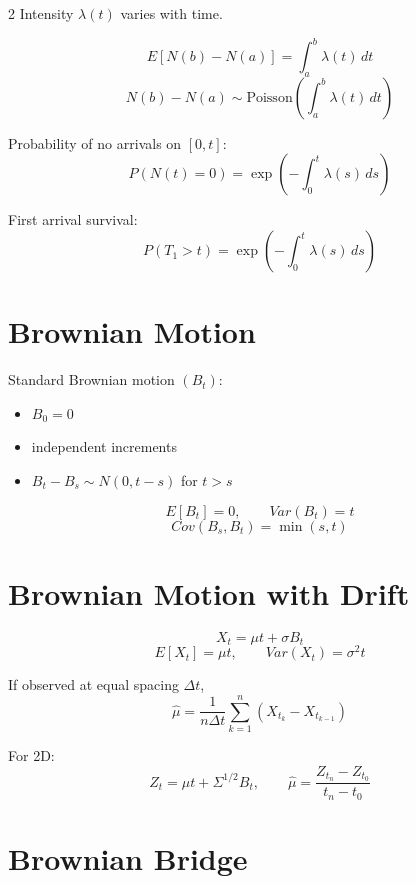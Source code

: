 \documentclass[10pt]{article}
\begin{document}
\begin{multicols}{2}
Intensity \(\lambda(t)\) varies with time.

\begin{formulabox}
\[
E[N(b)-N(a)]=\int_a^b \lambda(t)\,dt
\]
\[
N(b)-N(a)\sim \text{Poisson}\!\left(\int_a^b \lambda(t)\,dt\right)
\]
\end{formulabox}

Probability of no arrivals on \([0,t]\):
\[
P(N(t)=0)=\exp\left(-\int_0^t \lambda(s)\,ds\right)
\]

First arrival survival:
\[
P(T_1>t)=\exp\left(-\int_0^t \lambda(s)\,ds\right)
\]

\section{Brownian Motion}

\begin{definitionbox}
Standard Brownian motion \((B_t)\):
\begin{itemize}[leftmargin=12pt,itemsep=1pt]
\item \(B_0=0\)
\item independent increments
\item \(B_t-B_s\sim N(0,t-s)\) for \(t>s\)
\end{itemize}
\end{definitionbox}

\[
E[B_t]=0,\qquad Var(B_t)=t
\]
\[
Cov(B_s,B_t)=\min(s,t)
\]

\section{Brownian Motion with Drift}

\begin{formulabox}
\[
X_t=\mu t+\sigma B_t
\]
\[
E[X_t]=\mu t,\qquad Var(X_t)=\sigma^2 t
\]
\end{formulabox}

If observed at equal spacing \(\Delta t\),
\[
\hat\mu=\frac{1}{n\Delta t}\sum_{k=1}^n (X_{t_k}-X_{t_{k-1}})
\]

For 2D:
\[
Z_t=\mu t+\Sigma^{1/2}B_t,
\qquad
\hat\mu=\frac{Z_{t_n}-Z_{t_0}}{t_n-t_0}
\]

\section{Brownian Bridge}


\end{multicols}
\end{document}
